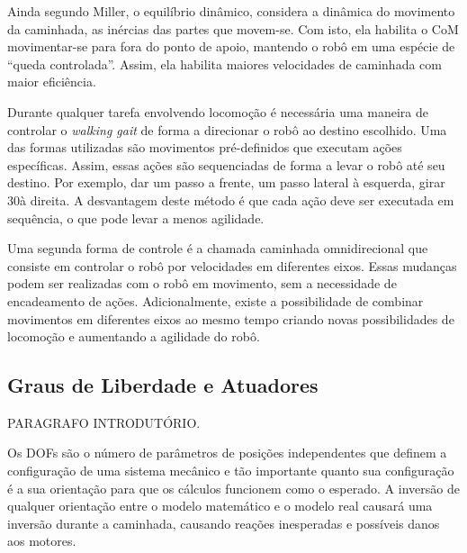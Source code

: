 \begin{draft}	
	Ainda segundo Miller, o equilíbrio dinâmico, considera a dinâmica do movimento da caminhada, as inércias das partes que movem-se. Com isto, ela habilita o CoM movimentar-se para fora do ponto de apoio, mantendo o robô em uma espécie de ``queda controlada''. Assim, ela habilita maiores velocidades de caminhada com maior eficiência.
\end{draft}

\begin{draft}
	Durante qualquer tarefa envolvendo locomoção é necessária uma maneira de controlar o \textit{walking gait} de forma a direcionar o robô ao destino escolhido. Uma das formas utilizadas são movimentos pré-definidos que executam ações específicas. Assim, essas ações são sequenciadas de forma a levar o robô até seu destino. Por exemplo, dar um passo a frente, um passo lateral à esquerda, girar 30\degree à direita. A desvantagem deste método é que cada ação deve ser executada em sequência, o que pode levar a menos agilidade.
\end{draft}

\begin{draft}
	Uma segunda forma de controle é a chamada caminhada omnidirecional que consiste em controlar o robô por velocidades em diferentes eixos. Essas mudanças podem ser realizadas com o robô em movimento, sem a necessidade de encadeamento de ações. Adicionalmente, existe a possibilidade de combinar movimentos em diferentes eixos ao mesmo tempo criando novas possibilidades de locomoção e aumentando a agilidade do robô.
\end{draft}

\noindent\makebox[\linewidth]{\rule{\paperwidth}{0.4pt}}

\subsection{Graus de Liberdade e Atuadores}
\label{subsec:architecture:Atuators}

PARAGRAFO INTRODUTÓRIO.

Os DOFs são o número de parâmetros de posições independentes que definem a configuração de uma sistema mecânico \cite{craig1989} e tão importante quanto sua configuração é a sua orientação para que os cálculos funcionem como o esperado. A inversão de qualquer orientação entre o modelo matemático e o modelo real causará uma inversão durante a caminhada, causando reações inesperadas e possíveis danos aos motores.

